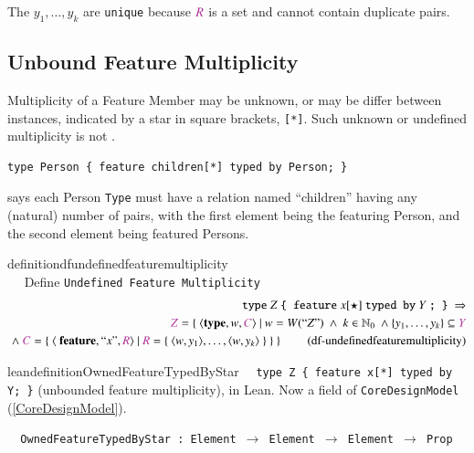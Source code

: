 \pn The $y_1,\ldots,y_k$ are \texttt{unique} because $\mc{R}$ is a set and cannot contain duplicate pairs.

\subsection{Unbound Feature Multiplicity}  

\pn Multiplicity of a Feature Member may be unknown, or may be differ between instances, indicated by a star in square brackets, \texttt{[*]}.  Such unknown or undefined multiplicity is  not .

\begin{lstlisting}
type Person { feature children[*] typed by Person; }
\end{lstlisting}
says each Person \texttt{Type} must have a relation named ``children'' having any (natural) number of pairs, with the first element being the featuring Person, and the second element being  featured Persons.  

\begin{restatable}{definition}{dfundefinedfeaturemultiplicity}~~ \\ ~~ Define \texttt{Undefined Feature Multiplicity}
\begin{align}
\texttt{type}~ Z ~\texttt{\{ feature}~ x[\star] ~\texttt{typed by}~ Y~\texttt{; \}}~\Rightarrow  \notag \\
\mc{Z}=\{~\langle \textbf{type},w,\mc{C}\rangle~\vert~w=W(``Z")~\wedge~k \in \mathbb{N}_0~\wedge \{ y_1,\ldots,y_k \} \subseteq \mc{Y} \notag \\
~\wedge~ \mc{C}=\{~\langle~\textbf{feature}, ``x",\mc{R} \rangle~\vert ~\mc{R}=\{~\langle w,y_1\rangle,\ldots,\langle w,y_k\rangle~\}~\}~\}~\label{eq:df-undefinedfeaturemultiplicity}\tag{df-undefinedfeaturemultiplicity}
\end{align}
\end{restatable}

\begin{restatable}{leandefinition}{OwnedFeatureTypedByStar}~~ \texttt{type Z \{
feature x[*] typed by Y; \}} (unbounded feature multiplicity), in Lean. Now a field of
\texttt{CoreDesignModel} (\ref{CoreDesignModel}).

\texttt{~~OwnedFeatureTypedByStar : Element $\to$ Element $\to$ Element $\to$ Prop}
\label{OwnedFeatureTypedByStar}
\end{restatable}

